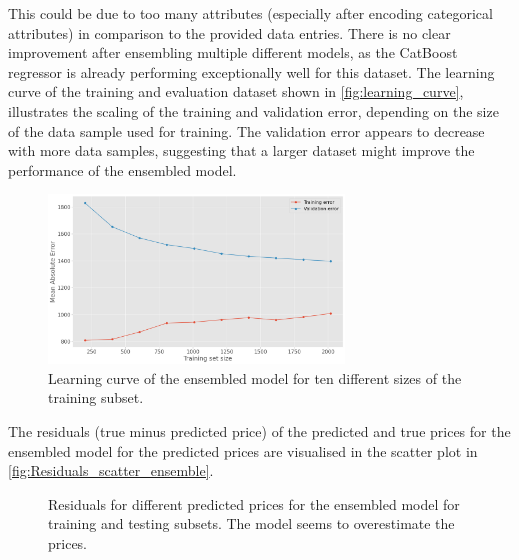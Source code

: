 This could be due to too many attributes (especially after encoding categorical attributes) in comparison to the provided data entries.
There is no clear improvement after ensembling multiple different models, as the CatBoost regressor is already performing exceptionally
well for this dataset. The learning curve of the training and evaluation dataset shown in \autoref{fig:learning_curve}, illustrates
the scaling of the training and validation error, depending on the size of the data sample used for training. The 
validation error appears to decrease with more data samples, suggesting that a larger dataset might improve the performance of the ensembled model.
\begin{figure}
    \centering
        \includegraphics[width=0.7\textwidth]{"content/pics/Learning_curve.png"}
        \caption{Learning curve of the ensembled model for ten different sizes of the training subset.}
        \label{fig:learning_curve}
\end{figure}

The residuals (true minus predicted price) of the predicted and true prices for the ensembled model for the predicted prices are visualised in the scatter plot in \autoref{fig:Residuals_scatter_ensemble}.
\begin{figure}
    \centering
        \caption{Residuals for different predicted prices for the ensembled model for training and testing subsets. The model seems to overestimate the prices.}
        \label{fig:Residuals_scatter_ensemble}
\end{figure}

